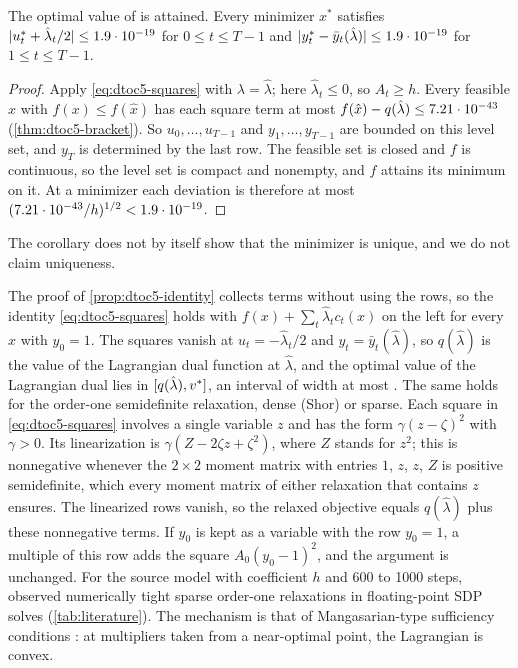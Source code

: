 \begin{corollary}\label{cor:dtoc5-attained}
The optimal value of  is attained.
Every minimizer $x^*$ satisfies $|u^*_t+\hat\lambda_t/2|\le1.9\cdot 10^{-19}$ for $0\le t\le T-1$ and $|y^*_t-\bar y_t(\hat\lambda)|\le1.9\cdot 10^{-19}$ for $1\le t\le T-1$.
\end{corollary}

\begin{proof}
Apply \eqref{eq:dtoc5-squares} with $\lambda=\hat\lambda$; here $\hat\lambda_t\le0$, so $A_t\ge h$.
Every feasible $x$ with $f(x)\le f(\hat x)$ has each square term at most $f(\hat x)-q(\hat\lambda)\le7.21\cdot 10^{-43}$ (\cref{thm:dtoc5-bracket}).
So $u_0,\dots,u_{T-1}$ and $y_1,\dots,y_{T-1}$ are bounded on this level set, and $y_T$ is determined by the last row.
The feasible set is closed and $f$ is continuous, so the level set is compact and nonempty, and $f$ attains its minimum on it.
At a minimizer each deviation is therefore at most $(7.21\cdot 10^{-43}/h)^{1/2}<1.9\cdot 10^{-19}$.
\end{proof}

The corollary does not by itself show that the minimizer is unique, and we do not claim uniqueness.

\begin{remark}\label{rem:dtoc5-sdp}
The proof of \cref{prop:dtoc5-identity} collects terms without using the rows, so the identity \eqref{eq:dtoc5-squares} holds with $f(x)+\sum_t\hat\lambda_tc_t(x)$ on the left for every $x$ with $y_0=1$.
The squares vanish at $u_t=-\hat\lambda_t/2$ and $y_t=\bar y_t(\hat\lambda)$, so $q(\hat\lambda)$ is the value of the Lagrangian dual function at $\hat\lambda$, and the optimal value of the Lagrangian dual lies in $[q(\hat\lambda),v^{*}]$, an interval of width at most .
The same holds for the order-one semidefinite relaxation, dense (Shor) or sparse.
Each square in \eqref{eq:dtoc5-squares} involves a single variable $z$ and has the form $\gamma(z-\zeta)^2$ with $\gamma>0$.
Its linearization is $\gamma(Z-2\zeta z+\zeta^2)$, where $Z$ stands for $z^2$; this is nonnegative whenever the $2\times2$ moment matrix with entries $1$, $z$, $z$, $Z$ is positive semidefinite, which every moment matrix of either relaxation that contains $z$ ensures.
The linearized rows vanish, so the relaxed objective equals $q(\hat\lambda)$ plus these nonnegative terms.
If $y_0$ is kept as a variable with the row $y_0=1$, a multiple of this row adds the square $A_0(y_0-1)^2$, and the argument is unchanged.
For the source model with coefficient $h$ and 600 to 1000 steps, \citet{waki2006-sums-of-squares-and-semidefinite} observed numerically tight sparse order-one relaxations in floating-point SDP solves (\cref{tab:literature}).
The mechanism is that of Mangasarian-type sufficiency conditions \citep{mangasarian1966-sufficient-conditions-for-the-optimal}: at multipliers taken from a near-optimal point, the Lagrangian is convex.
\end{remark}

